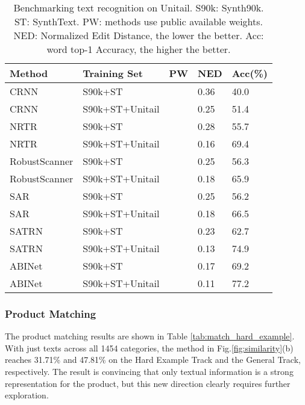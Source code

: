\documentclass[runningheads]{llncs}
\begin{document}
\begin{SCtable}[]
\centering
\setlength\tabcolsep{1.2pt}
\caption{Benchmarking text recognition on Unitail. S90k: Synth90k. ST: SynthText. PW: methods use public available weights. NED: Normalized Edit Distance, the lower the better. Acc: word top-1 Accuracy, the higher the better.}
\begin{tabular}{l|l|c|ll}
\hline \hline
Method      & Training Set     &  PW            & NED     & Acc(\%)   \\ \hline
CRNN\cite{CRNN}        & S90k+ST            &    & 0.36    & 40.0     \\
CRNN        & S90k+ST+Unitail    &                & 0.25    & 51.4    \\
NRTR\cite{sheng2019nrtr}        & S90k+ST            &    & 0.28    & 55.7     \\
NRTR        & S90k+ST+Unitail    &                & 0.16    & 69.4    \\
RobustScanner\cite{yue2020robustscanner}        & S90k+ST            &    & 0.25    & 56.3     \\
RobustScanner        & S90k+ST+Unitail    &                & 0.18    & 65.9    \\
SAR\cite{li2019SAR}        & S90k+ST            &    & 0.25    & 56.2     \\
SAR        & S90k+ST+Unitail    &                & 0.18    & 66.5    \\
SATRN\cite{SATRN}        & S90k+ST            &    & 0.23    & 62.7     \\
SATRN        & S90k+ST+Unitail    &                & 0.13    & 74.9    \\
ABINet\cite{fang2021ABINet}        & S90k+ST            &    & 0.17    & 69.2     \\
ABINet        & S90k+ST+Unitail    &                & 0.11    & 77.2    \\
\hline
\end{tabular}
\label{tab:textrecog}
\end{SCtable}

\subsubsection{Product Matching}
The product matching results are shown in Table \ref{tab:match_hard_example}. With just texts across all 1454 categories, the method in Fig.\ref{fig:similarity}(b) reaches 31.71\% and 47.81\% on the Hard Example Track and the General Track, respectively. The result is convincing that only textual information is a strong representation for the product, but this new direction clearly requires further exploration.
\end{document}
